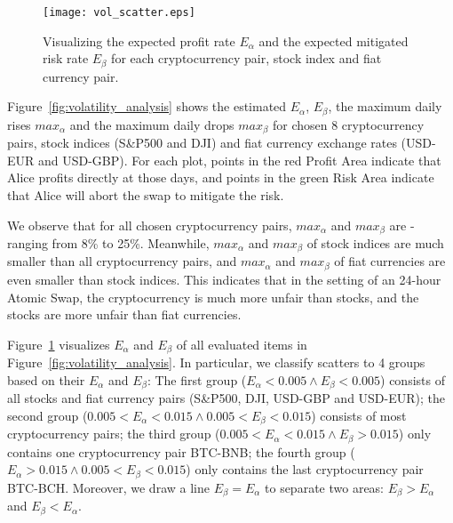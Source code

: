 \begin{figure}
    \texttt{[image: vol\_scatter.eps]}
    \caption{Visualizing the expected profit rate $E_\alpha$ and the expected mitigated risk rate $E_\beta$ for each cryptocurrency pair, stock index and fiat currency pair.}
    \label{fig:vol_scatter}
\end{figure}

Figure~\ref{fig:volatility_analysis} shows the estimated $E_\alpha$, $E_\beta$, the maximum daily rises $max_\alpha$ and the maximum daily drops $max_\beta$ for chosen 8 cryptocurrency pairs, stock indices (S\&P500 and DJI) and fiat currency exchange rates (USD-EUR and USD-GBP).
For each plot, points in the red Profit Area indicate that Alice profits directly at those days, and points in the green Risk Area indicate that Alice will abort the swap to mitigate the risk.

We observe that for all chosen cryptocurrency pairs, $max_\alpha$ and $max_\beta$ are  - ranging from 8\% to 25\%.
Meanwhile, $max_\alpha$ and $max_\beta$ of stock indices are much smaller than all cryptocurrency pairs,
and $max_\alpha$ and $max_\beta$ of fiat currencies are even smaller than stock indices.
This indicates that in the setting of an 24-hour Atomic Swap, the cryptocurrency is much more unfair than stocks, and the stocks are more unfair than fiat currencies.


Figure~\ref{fig:vol_scatter} visualizes $E_\alpha$ and $E_\beta$ of all evaluated items in Figure~\ref{fig:volatility_analysis}.
In particular, we classify scatters to 4 groups based on their $E_\alpha$ and $E_\beta$:
The first group ($E_\alpha < 0.005 \wedge E_\beta < 0.005$) consists of all stocks and fiat currency pairs (S\&P500, DJI, USD-GBP and USD-EUR);
the second group ($0.005 < E_\alpha < 0.015 \wedge 0.005 < E_\beta < 0.015$) consists of most cryptocurrency pairs;
the third group ($0.005 < E_\alpha < 0.015 \wedge E_\beta > 0.015$) only contains one cryptocurrency pair BTC-BNB;
the fourth group ($E_\alpha > 0.015 \wedge 0.005 < E_\beta < 0.015$) only contains the last cryptocurrency pair BTC-BCH.
Moreover, we draw a line $E_\beta = E_\alpha$ to separate two areas: $E_\beta > E_\alpha$ and $E_\beta < E_\alpha$.

